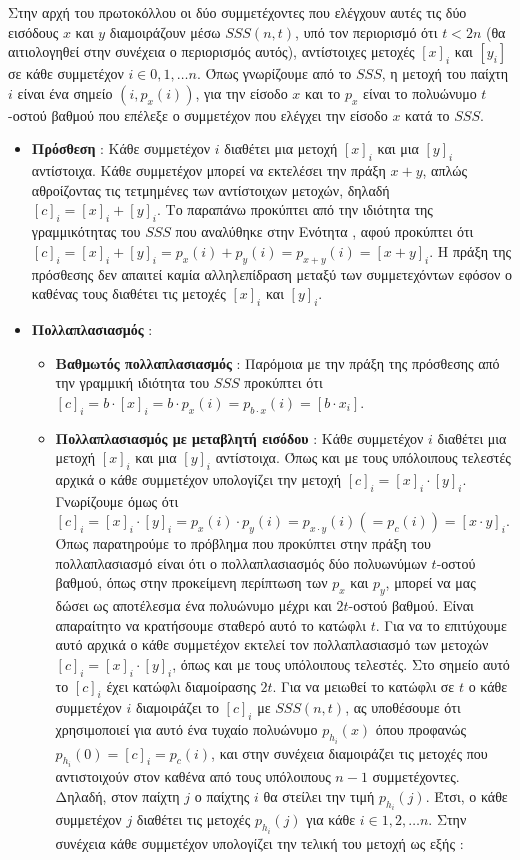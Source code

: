 Στην αρχή του πρωτοκόλλου οι δύο συμμετέχοντες που ελέγχουν αυτές τις δύο εισόδους $x$ και $y$ διαμοιράζουν μέσω $SSS(n,t)$, υπό τον περιορισμό ότι $t < 2n$ (θα αιτιολογηθεί στην συνέχεια ο περιορισμός αυτός), αντίστοιχες μετοχές $[x]_i$ και $[y_i]$ σε κάθε συμμετέχον $i \in 0, 1, \ldots n$. Όπως γνωρίζουμε από το $SSS$, η μετοχή του παίχτη $i$ είναι ένα σημείο $(i, p_x(i))$, για την είσοδο $x$ και το $p_x$ είναι το πολυώνυμο $t$-οστού βαθμού που επέλεξε ο συμμετέχον που ελέγχει την είσοδο $x$ κατά το $SSS$.


\begin{itemize}
    \item \textbf{Πρόσθεση} : Κάθε συμμετέχον $i$ διαθέτει μια μετοχή $[x]_i$ και μια $[y]_i$ αντίστοιχα. Κάθε συμμετέχον μπορεί να εκτελέσει την πράξη $x+y$, απλώς αθροίζοντας τις τετμημένες των αντίστοιχων μετοχών, δηλαδή $[c]_i = [x]_i + [y]_i$. Το παραπάνω προκύπτει από την ιδιότητα της γραμμικότητας του $SSS$ που αναλύθηκε στην Ενότητα , αφού προκύπτει ότι $[c]_i = [x]_i + [y]_i = p_x(i) + p_y(i) = p_{x+y}(i) = [x + y]_i$. Η πράξη της πρόσθεσης δεν απαιτεί καμία αλληλεπίδραση μεταξύ των συμμετεχόντων εφόσον ο καθένας τους διαθέτει τις μετοχές $[x]_i$ και $[y]_i$.
    \item \textbf{Πολλαπλασιασμός} :  
        \begin{itemize}
            \item \textbf{Βαθμωτός πολλαπλασιασμός} : Παρόμοια με την πράξη της πρόσθεσης από την γραμμική ιδιότητα του $SSS$ προκύπτει ότι $[c]_i = b \cdot [x]_i = b \cdot p_x(i) = p_{b \cdot x}(i) = [b \cdot x_i ]$.
            \item \textbf{Πολλαπλασιασμός με μεταβλητή εισόδου} : Κάθε συμμετέχον $i$ διαθέτει μια μετοχή $[x]_i$ και μια $[y]_i$ αντίστοιχα. Όπως και με τους υπόλοιπους τελεστές αρχικά ο κάθε συμμετέχον υπολογίζει την μετοχή $[c]_i = [x]_i \cdot [y]_i$. Γνωρίζουμε όμως ότι $[c]_i = [x]_i \cdot [y]_i = p_x(i) \cdot p_y(i) = p_{x \cdot y}(i) (= p_c(i))= [x \cdot y]_i$. Όπως παρατηρούμε το πρόβλημα που προκύπτει στην πράξη του πολλαπλασιασμό είναι ότι ο πολλαπλασιασμός δύο πολυωνύμων $t$-οστού βαθμού, όπως στην προκείμενη περίπτωση των $p_x$ και $p_y$, μπορεί να μας δώσει ως αποτέλεσμα ένα πολυώνυμο μέχρι και $2t$-οστού βαθμού. Είναι απαραίτητο να κρατήσουμε σταθερό αυτό το κατώφλι $t$. Για να το επιτύχουμε αυτό αρχικά ο κάθε συμμετέχον εκτελεί τον πολλαπλασιασμό των μετοχών $[c]_i = [x]_i \cdot [y]_i$, όπως και με τους υπόλοιπους τελεστές. Στο σημείο αυτό το $[c]_i$ έχει κατώφλι διαμοίρασης $2t$. Για να μειωθεί το κατώφλι σε $t$ ο κάθε συμμετέχον $i$ διαμοιράζει το $[c]_i$ με $SSS(n, t)$, ας υποθέσουμε ότι χρησιμοποιεί για αυτό ένα τυχαίο πολυώνυμο $p_{h_i}(x)$ όπου προφανώς $p_{h_i}(0)=[c]_i=p_c(i)$, και στην συνέχεια διαμοιράζει τις μετοχές που αντιστοιχούν στον καθένα από τους υπόλοιπους $n-1$ συμμετέχοντες. Δηλαδή, στον παίχτη $j$ ο παίχτης $i$ θα στείλει την τιμή $p_{h_i}(j)$. Έτσι, ο κάθε συμμετέχον $j$ διαθέτει τις μετοχές $p_{h_i}(j)$ για κάθε $i \in 1, 2, \ldots n$. Στην συνέχεια κάθε συμμετέχον υπολογίζει την τελική του μετοχή ως εξής :
            

\end{itemize}
\end{itemize}
